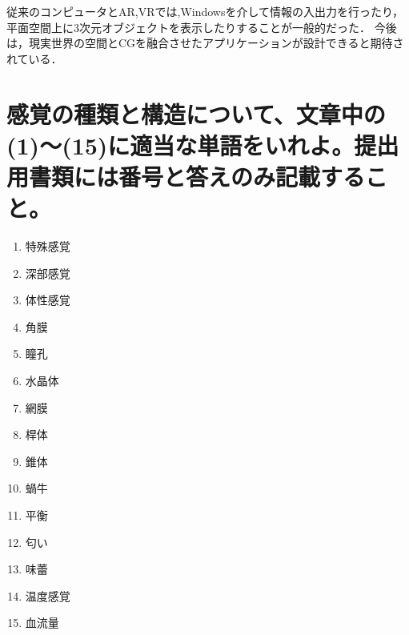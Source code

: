 \documentclass[titlepage,a4paper]{jsarticle}
\begin{document}
従来のコンピュータとAR,VRでは,Windowsを介して情報の入出力を行ったり，平面空間上に3次元オブジェクトを表示したりすることが一般的だった．
今後は，現実世界の空間とCGを融合させたアプリケーションが設計できると期待されている．
\section{感覚の種類と構造について、文章中の(1)〜(15)に適当な単語をいれよ。提出用書類には番号と答えのみ記載すること。}%
\begin{enumerate}
      \item 特殊感覚
      \item 深部感覚
      \item 体性感覚
      \item 角膜
      \item 瞳孔
      \item 水晶体
      \item 網膜
      \item 桿体
      \item 錐体
      \item 蝸牛
      \item 平衡
      \item 匂い
      \item 味蕾
      \item 温度感覚
      \item 血流量
\end{enumerate}
\end{document}
